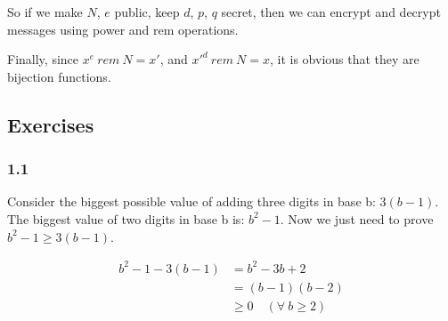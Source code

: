 \documentclass[11pt]{article}
\begin{document}
So if we make $N$, $e$ public, keep $d$, $p$, $q$ secret, then we can
encrypt and decrypt messages using power and rem operations.

Finally, since $x^e\ rem\ N = x'$, and $x'^d\ rem\ N = x$, it is
obvious that they are bijection functions. 

\subsection{Exercises}

\subsubsection{1.1}
Consider the biggest possible value of adding three digits in base b:
$3(b-1)$. The biggest value of two digits in base b is: $b^2-1$. Now
we just need to prove $b^2-1 \ge 3(b-1)$.

\begin{align}
  b^2-1-3(b-1) & = b^2-3b+2 \\
  & = (b-1)(b-2) \\
  & \ge 0\quad (\forall\ b \ge 2)
\end{align}
\end{document}

